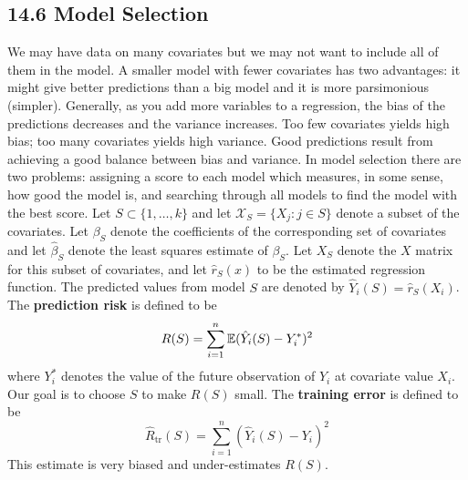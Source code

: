 \subsection*{14.6 Model Selection}\label{model-selection}
We may have data on many covariates but we may not want to include all
of them in the model. A smaller model with fewer covariates has two
advantages: it might give better predictions than a big model and it is
more parsimonious (simpler). Generally, as you add more variables to a
regression, the bias of the predictions decreases and the variance
increases. Too few covariates yields high bias; too many covariates
yields high variance. Good predictions result from achieving a good
balance between bias and variance.
In model selection there are two problems: assigning a score to each
model which measures, in some sense, how good the model is, and
searching through all models to find the model with the best score.
Let \(S \subset \{1, \dots, k\}\) and let
\(\mathcal{X}_S = \{ X_{j} : j \in S \}\) denote a subset of the
covariates. Let \(\beta_S\) denote the coefficients of the corresponding
set of covariates and let \(\hat{\beta}_S\) denote the least squares
estimate of \(\beta_S\). Let \(X_S\) denote the \(X\) matrix for this
subset of covariates, and let \(\hat{r}_S(x)\) to be the estimated
regression function. The predicted values from model \(S\) are denoted
by \(\hat{Y}_{i}(S) = \hat{r}_S(X_{i})\).
The \textbf{prediction risk} is defined to be
\[
R(S) = \sum_{i=1}^{n} \operatorname{\mathbb{E}} (\hat{Y}_{i}(S) - Y_{i}^{*})^{2}
\]
where \(Y_{i}^{*}\) denotes the value of the future observation of \(Y_{i}\)
at covariate value \(X_{i}\). Our goal is to choose \(S\) to make \(R(S)\)
small.
The \textbf{training error} is defined to be
\[
\hat{R}_\text{tr}(S) = \sum_{i=1}^{n} (\hat{Y}_{i}(S) - Y_{i})^{2}
\]
This estimate is very biased and under-estimates \(R(S)\).

